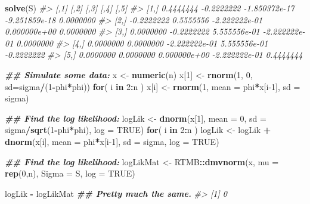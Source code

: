 \documentclass[
]{article}
\newenvironment{Shaded}{\begin{snugshade}}{\end{snugshade}}
\newcommand{\AttributeTok}[1]{\textcolor[rgb]{0.13,0.29,0.53}{#1}}
\newcommand{\CommentTok}[1]{\textcolor[rgb]{0.56,0.35,0.01}{\textit{#1}}}
\newcommand{\ConstantTok}[1]{\textcolor[rgb]{0.56,0.35,0.01}{#1}}
\newcommand{\ControlFlowTok}[1]{\textcolor[rgb]{0.13,0.29,0.53}{\textbf{#1}}}
\newcommand{\DecValTok}[1]{\textcolor[rgb]{0.00,0.00,0.81}{#1}}
\newcommand{\DocumentationTok}[1]{\textcolor[rgb]{0.56,0.35,0.01}{\textbf{\textit{#1}}}}
\newcommand{\FunctionTok}[1]{\textcolor[rgb]{0.13,0.29,0.53}{\textbf{#1}}}
\newcommand{\NormalTok}[1]{#1}
\newcommand{\OtherTok}[1]{\textcolor[rgb]{0.56,0.35,0.01}{#1}}
\newcommand{\SpecialCharTok}[1]{\textcolor[rgb]{0.81,0.36,0.00}{\textbf{#1}}}
\begin{document}
\begin{Shaded}
\begin{Highlighting}[]
\FunctionTok{solve}\NormalTok{(S)}
\CommentTok{\#\textgreater{}            [,1]       [,2]          [,3]          [,4]       [,5]}
\CommentTok{\#\textgreater{} [1,]  0.4444444 {-}0.2222222 {-}1.850372e{-}17 {-}9.251859e{-}18  0.0000000}
\CommentTok{\#\textgreater{} [2,] {-}0.2222222  0.5555556 {-}2.222222e{-}01  0.000000e+00  0.0000000}
\CommentTok{\#\textgreater{} [3,]  0.0000000 {-}0.2222222  5.555556e{-}01 {-}2.222222e{-}01  0.0000000}
\CommentTok{\#\textgreater{} [4,]  0.0000000  0.0000000 {-}2.222222e{-}01  5.555556e{-}01 {-}0.2222222}
\CommentTok{\#\textgreater{} [5,]  0.0000000  0.0000000  0.000000e+00 {-}2.222222e{-}01  0.4444444}
\end{Highlighting}
\end{Shaded}

\begin{Shaded}
\begin{Highlighting}[]
\DocumentationTok{\#\# Simulate some data:}
\NormalTok{x }\OtherTok{\textless{}{-}} \FunctionTok{numeric}\NormalTok{(n)}
\NormalTok{x[}\DecValTok{1}\NormalTok{] }\OtherTok{\textless{}{-}} \FunctionTok{rnorm}\NormalTok{(}\DecValTok{1}\NormalTok{, }\DecValTok{0}\NormalTok{, }\AttributeTok{sd=}\NormalTok{sigma}\SpecialCharTok{/}\NormalTok{(}\DecValTok{1}\SpecialCharTok{{-}}\NormalTok{phi}\SpecialCharTok{*}\NormalTok{phi))}
\ControlFlowTok{for}\NormalTok{( i }\ControlFlowTok{in} \DecValTok{2}\SpecialCharTok{:}\NormalTok{n ) x[i] }\OtherTok{\textless{}{-}} \FunctionTok{rnorm}\NormalTok{(}\DecValTok{1}\NormalTok{, }\AttributeTok{mean =}\NormalTok{ phi}\SpecialCharTok{*}\NormalTok{x[i}\DecValTok{{-}1}\NormalTok{], }\AttributeTok{sd =}\NormalTok{ sigma)}

\DocumentationTok{\#\# Find the log likelihood:}
\NormalTok{logLik }\OtherTok{\textless{}{-}} \FunctionTok{dnorm}\NormalTok{(x[}\DecValTok{1}\NormalTok{], }\AttributeTok{mean =} \DecValTok{0}\NormalTok{, }\AttributeTok{sd =}\NormalTok{ sigma}\SpecialCharTok{/}\FunctionTok{sqrt}\NormalTok{(}\DecValTok{1}\SpecialCharTok{{-}}\NormalTok{phi}\SpecialCharTok{*}\NormalTok{phi), }\AttributeTok{log =} \ConstantTok{TRUE}\NormalTok{)}
\ControlFlowTok{for}\NormalTok{( i }\ControlFlowTok{in} \DecValTok{2}\SpecialCharTok{:}\NormalTok{n ) logLik }\OtherTok{\textless{}{-}}\NormalTok{ logLik }\SpecialCharTok{+} \FunctionTok{dnorm}\NormalTok{(x[i], }\AttributeTok{mean =}\NormalTok{ phi}\SpecialCharTok{*}\NormalTok{x[i}\DecValTok{{-}1}\NormalTok{], }\AttributeTok{sd =}\NormalTok{ sigma, }\AttributeTok{log =} \ConstantTok{TRUE}\NormalTok{)}

\DocumentationTok{\#\# Find the log likelihood:}
\NormalTok{logLikMat }\OtherTok{\textless{}{-}}\NormalTok{ RTMB}\SpecialCharTok{::}\FunctionTok{dmvnorm}\NormalTok{(x, }\AttributeTok{mu =} \FunctionTok{rep}\NormalTok{(}\DecValTok{0}\NormalTok{,n), }\AttributeTok{Sigma =}\NormalTok{ S, }\AttributeTok{log =} \ConstantTok{TRUE}\NormalTok{)}

\NormalTok{logLik }\SpecialCharTok{{-}}\NormalTok{ logLikMat  }\DocumentationTok{\#\# Pretty much the same.}
\CommentTok{\#\textgreater{} [1] 0}
\end{Highlighting}
\end{Shaded}
\end{document}
